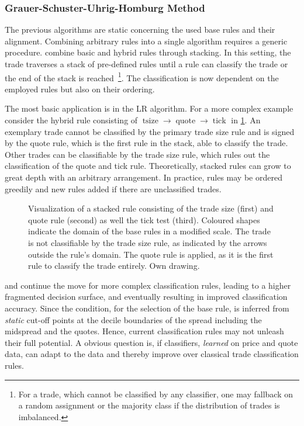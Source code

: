 \subsubsection{Grauer-Schuster-Uhrig-Homburg Method}\label{sec:stacked-rule}

The previous algorithms are static concerning the used base rules and their alignment. Combining arbitrary rules into a single algorithm requires a generic procedure. \textcite[][18]{grauerOptionTradeClassification2022} combine basic and hybrid rules through stacking. In this setting, the trade traverses a stack of pre-defined rules until a rule can classify the trade or the end of the stack is reached~\footnote{For a trade, which cannot be classified by any classifier, one may fallback on a random assignment or the majority class if the distribution of trades is imbalanced.}. The classification is now dependent on the employed rules but also on their ordering.

The most basic application is in the \gls{LR} algorithm. For a more complex example consider the hybrid rule consisting of $\operatorname{tsize} \to \operatorname{quote} \to \operatorname{tick}$ in \cref{fig:stacking-algo}. An exemplary trade cannot be classified by the primary trade size rule and is signed by the quote rule, which is the first rule in the stack, able to classify the trade. Other trades can be classifiable by the trade size rule, which rules out the classification of the quote and tick rule. Theoretically, stacked rules can grow to great depth with an arbitrary arrangement. In practice, rules may be ordered greedily and new rules added if there are unclassified trades.

\begin{figure}[ht!]
    \centering
    
    \caption[Visualization Of A Stacked Rule]{Visualization of a stacked rule consisting of the trade size (first) and quote rule (second) as well the tick test (third). Coloured shapes indicate the domain of the base rules in a modified scale. The trade is not classifiable by the trade size rule, as indicated by the arrows outside the rule's domain. The quote rule is applied, as it is the first rule to classify the trade entirely. Own drawing.}
    \label{fig:stacking-algo}
\end{figure}

\textcite[][3811]{chakrabartyTradeClassificationAlgorithms2007} and \textcite[][18]{grauerOptionTradeClassification2022} continue the move for more complex classification rules, leading to a higher fragmented decision surface, and eventually resulting in improved classification accuracy. Since the condition, for the selection of the base rule, is inferred from \emph{static} cut-off points at the decile boundaries of the spread including the midspread and the quotes. Hence, current classification rules may not unleash their full potential. A obvious question is, if classifiers, \emph{learned} on price and quote data, can adapt to the data and thereby improve over classical trade classification rules.

